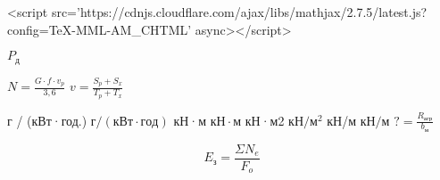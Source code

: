 <script src='https://cdnjs.cloudflare.com/ajax/libs/mathjax/2.7.5/latest.js?config=TeX-MML-AM_CHTML' async></script>



\(P_д\)

\displaystyle \(N=\frac{G \cdot f \cdot v_p}{3,6}\)
\(\displaystyle v=\frac{S_p+S_x}{T_p+T_x}\)


г / (кВт·год.) \( г / (кВт \cdot год) \)
кН·м           \( кН \cdot м \)
кН·м2          \(кН/м^2\)
кН/м           \(кН/м\)
\( \displaystyle ?=\frac{R_{агр}}{b_м} \) 

$$
E_{з}=\frac{\Sigma N_e}{F_o}
$$

\(  \)